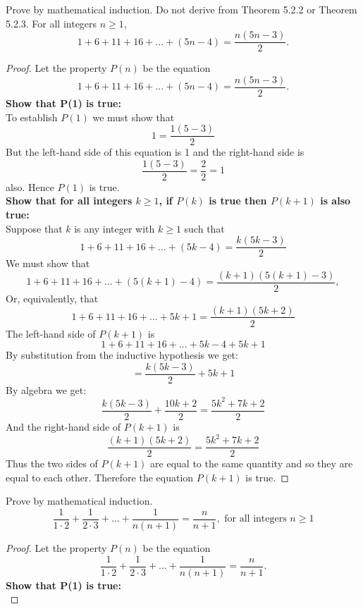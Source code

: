\documentclass[12pt,letterpaper, onecolumn]{exam}
\begin{document}
\begin{questions}
\begin{solution}
	\end{solution}
		Prove by mathematical induction. Do not derive from Theorem 5.2.2 or Theorem 5.2.3.
		\setcounter{question}{6}\question For all integers $n\geq1$,
		$$1+6+11+16+...+(5n-4)=\frac{n(5n-3)}{2}.$$
		\begin{solution}
			\begin{proof}
			Let the property $P(n)$ be the equation
				$$1+6+11+16+...+(5n-4)=\frac{n(5n-3)}{2}.$$
			\textbf{Show that P(1) is true:}\\
			To establish $P(1)$ we must show that
			$$1=\frac{1(5-3)}{2}$$
			But the left-hand side of this equation is 1 and the right-hand side is
			$$\frac{1(5-3)}{2}=\frac{2}{2}=1$$
			also. Hence $P(1)$ is true.\\
			\textbf{Show that for all integers $k\geq1$, if $P(k)$ is true then $P(k+1)$ is also true:}\\
			Suppose that $k$ is any integer with $k\geq1$ such that
				$$1+6+11+16+...+(5k-4)=\frac{k(5k-3)}{2}$$
				We must show that
					$$1+6+11+16+...+(5(k+1)-4)=\frac{(k+1)(5(k+1)-3)}{2},$$
					Or, equivalently, that
					$$1+6+11+16+...+5k+1=\frac{(k+1)(5k+2)}{2}$$
					The left-hand side of $P(k+1)$ is
					$$1+6+11+16+...+5k-4+5k+1$$ 
					By substitution from the inductive hypothesis we get:
					$$=\frac{k(5k-3)}{2}+5k+1$$
					By algebra we get:
					$$\frac{k(5k-3)}{2}+\frac{10k+2}{2}=\frac{5k^2+7k+2}{2}$$
					And the right-hand side of $P(k+1)$ is
					$$\frac{(k+1)(5k+2)}{2}=\frac{5k^2+7k+2}{2}$$
					Thus the two sides of $P(k+1)$ are equal to the same quantity and so they are equal to each other. Therefore the equation $P(k+1)$ is true.
			\end{proof}
		\end{solution}
		Prove by mathematical induction.
		\setcounter{question}{11}\question $$\frac{1}{1\cdot2}+\frac{1}{2\cdot3}+...+\frac{1}{n(n+1)}=\frac{n}{n+1}, \textrm{ for all integers $n\geq1$}$$
			\begin{solution}
			\begin{proof}
				Let the property $P(n)$ be the equation
				$$\frac{1}{1\cdot2}+\frac{1}{2\cdot3}+...+\frac{1}{n(n+1)}=\frac{n}{n+1}.$$
				\textbf{Show that P(1) is true:}\\

\end{proof}
\end{solution}
\end{questions}
\end{document}
